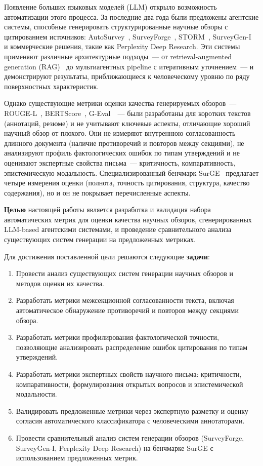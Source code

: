 \documentclass[a4paper,14pt]{extarticle}
\begin{document}
Появление больших языковых моделей (LLM) открыло возможность автоматизации этого процесса. За последние два года были предложены агентские системы, способные генерировать структурированные научные обзоры с цитированием источников: AutoSurvey~\cite{wang2024autosurvey}, SurveyForge~\cite{yan2025surveyforge}, STORM~\cite{shao2024storm}, SurveyGen-I~\cite{surveygen_i2025} и коммерческие решения, такие как Perplexity Deep Research. Эти системы применяют различные архитектурные подходы~--- от retrieval-augmented generation (RAG)~\cite{lewis2020rag} до мультиагентных pipeline с итеративным уточнением~--- и демонстрируют результаты, приближающиеся к человеческому уровню по ряду поверхностных характеристик.

Однако существующие метрики оценки качества генерируемых обзоров~--- ROUGE-L~\cite{lin2004rouge}, BERTScore~\cite{zhang2020bertscore}, G-Eval~\cite{liu2023geval}~--- были разработаны для коротких текстов (аннотаций, резюме) и не учитывают ключевые аспекты, отличающие хороший научный обзор от плохого. Они не измеряют внутреннюю согласованность длинного документа (наличие противоречий и повторов между секциями), не анализируют профиль фактологических ошибок по типам утверждений и не оценивают экспертные свойства письма~--- критичность, компаративность, эпистемическую модальность. Специализированный бенчмарк SurGE~\cite{su2025surge} предлагает четыре измерения оценки (полнота, точность цитирования, структура, качество содержания), но и он не покрывает перечисленные аспекты.

\textbf{Целью} настоящей работы является разработка и валидация набора автоматических метрик для оценки качества научных обзоров, сгенерированных LLM-based агентскими системами, и проведение сравнительного анализа существующих систем генерации на предложенных метриках.

Для достижения поставленной цели решаются следующие \textbf{задачи}:
\begin{enumerate}
    \item Провести анализ существующих систем генерации научных обзоров и методов оценки их качества.
    \item Разработать метрики межсекционной согласованности текста, включая автоматическое обнаружение противоречий и повторов между секциями обзора.
    \item Разработать метрики профилирования фактологической точности, позволяющие анализировать распределение ошибок цитирования по типам утверждений.
    \item Разработать метрики экспертных свойств научного письма: критичности, компаративности, формулирования открытых вопросов и эпистемической модальности.
    \item Валидировать предложенные метрики через экспертную разметку и оценку согласия автоматического классификатора с человеческими аннотаторами.
    \item Провести сравнительный анализ систем генерации обзоров (SurveyForge, SurveyGen-I, Perplexity Deep Research) на бенчмарке SurGE с использованием предложенных метрик.
\end{enumerate}
\end{document}
